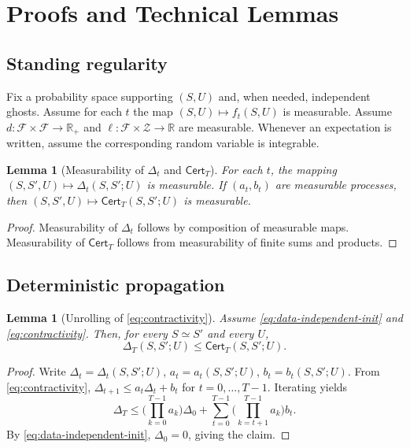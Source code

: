 \documentclass{article}
\newtheorem{lemma}[theorem]{Lemma}
\numberwithin{equation}{section}
\begin{document}



\appendix

\section{Proofs and Technical Lemmas}
\label{app:proofs}

\subsection{Standing regularity}
\label{app:standing}

Fix a probability space supporting $(S,U)$ and, when needed, independent ghosts.
Assume for each $t$ the map $(S,U)\mapsto f_t(S,U)$ is measurable.
Assume $d:\mathcal{F}\times\mathcal{F}\to\mathbb{R}_+$ and $\ell:\mathcal{F}\times\mathcal{Z}\to\mathbb{R}$ are measurable.
Whenever an expectation is written, assume the corresponding random variable is integrable.

\begin{lemma}[Measurability of $\Delta_t$ and $\mathsf{Cert}_T$]
	\label{lem:measurability}
	For each $t$, the mapping $(S,S',U)\mapsto \Delta_t(S,S';U)$ is measurable.
	If $(a_t,b_t)$ are measurable processes, then $(S,S',U)\mapsto \mathsf{Cert}_T(S,S';U)$ is measurable.
\end{lemma}

\begin{proof}
	Measurability of $\Delta_t$ follows by composition of measurable maps.
	Measurability of $\mathsf{Cert}_T$ follows from measurability of finite sums and products.
\end{proof}

\subsection{Deterministic propagation}
\label{app:propagation}

\begin{lemma}[Unrolling of \eqref{eq:contractivity}]
	\label{lem:unrolling-app}
	Assume \eqref{eq:data-independent-init} and \eqref{eq:contractivity}.
	Then, for every $S\simeq S'$ and every $U$,
	\[
	\Delta_T(S,S';U)\le \mathsf{Cert}_T(S,S';U).
	\]
\end{lemma}

\begin{proof}
	Write $\Delta_t=\Delta_t(S,S';U)$, $a_t=a_t(S,S';U)$, $b_t=b_t(S,S';U)$.
	From \eqref{eq:contractivity}, $\Delta_{t+1}\le a_t\Delta_t+b_t$ for $t=0,\dots,T-1$.
	Iterating yields
	\[
	\Delta_T
	\le
	\Big(\prod_{k=0}^{T-1} a_k\Big)\Delta_0
	+
	\sum_{t=0}^{T-1}\Big(\prod_{k=t+1}^{T-1} a_k\Big)b_t.
	\]
	By \eqref{eq:data-independent-init}, $\Delta_0=0$, giving the claim.
\end{proof}
\end{document}
